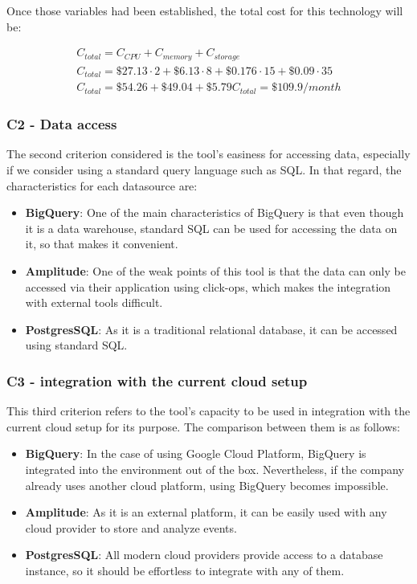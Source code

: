 \documentclass[english, 12pt, a4paper, sci, utf8, a-1b, online]{aaltothesis}
\begin{document}
Once those variables had been established, the total cost for this technology will be:

\begin{equation}
\begin{split}
    C_{total} = C_{CPU} + C_{memory} + C_{storage}\\
    C_{total} = \$27.13 \cdot 2 + \$6.13 \cdot 8 + \$0.176 \cdot 15 + \$0.09 \cdot 35\\
    C_{total} = \$54.26 + \$49.04 + \$5.79
    C_{total} = \$109.9 / month
\end{split}
\end{equation}

\subsubsection*{C2 - Data access}

The second criterion considered is the tool's easiness for accessing data, especially if we consider using a standard query language such as SQL. In that regard, the characteristics for each datasource are:
\begin{itemize}
    \item \textbf{BigQuery}: One of the main characteristics of BigQuery is that even though it is a data warehouse, standard SQL can be used for accessing the data on it, so that makes it convenient.
    \item \textbf{Amplitude}: One of the weak points of this tool is that the data can only be accessed via their application using click-ops, which makes the integration with external tools difficult.
    \item \textbf{PostgresSQL}: As it is a traditional relational database, it can be accessed using standard SQL.
\end{itemize}

\subsubsection*{C3 - integration with the current cloud setup}

This third criterion refers to the tool's capacity to be used in integration with the current cloud setup for its purpose. The comparison between them is as follows:

\begin{itemize}
    \item \textbf{BigQuery}: In the case of using Google Cloud Platform, BigQuery is integrated into the environment out of the box. Nevertheless, if the company already uses another cloud platform, using BigQuery becomes impossible.
    \item \textbf{Amplitude}: As it is an external platform, it can be easily used with any cloud provider to store and analyze events. 
    \item \textbf{PostgresSQL}: All modern cloud providers provide access to a database instance, so it should be effortless to integrate with any of them. 
\end{itemize}
\end{document}
